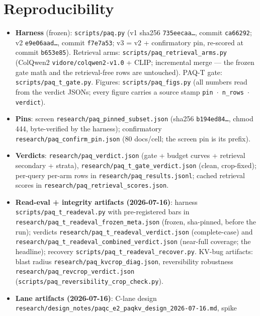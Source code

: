 \documentclass[11pt,letterpaper]{article}
\newcommand{\paqt}{\textsc{PAQ-T}}
\begin{document}
\section{Reproducibility}\label{app:repro}
\begin{itemize}\small
  \item \textbf{Harness} (frozen): \texttt{scripts/paq.py} (v1 sha256 \texttt{735eecaa\ldots},
        commit \texttt{ca66292}; v2 \texttt{e9e06aad\ldots}, commit \texttt{f7e7a53}; v3 = v2 +
        confirmatory pin, re-scored at commit \texttt{b653e85}). Retrieval arms:
        \texttt{scripts/paq\_retrieval\_arms.py} (ColQwen2 \texttt{vidore/colqwen2-v1.0} + CLIP;
        incremental merge --- the frozen gate math and the retrieval-free rows are untouched).
        \paqt{} gate: \texttt{scripts/paq\_t\_gate.py}. Figures: \texttt{scripts/paq\_figs.py}
        (all numbers read from the verdict JSONs; every figure carries a source stamp
        \texttt{pin\,$\cdot$\,n\_rows\,$\cdot$\,verdict}).
  \item \textbf{Pins}: screen \texttt{research/paq\_pinned\_subset.json} (sha256
        \texttt{b194ed84\ldots}, chmod 444, byte-verified by the harness); confirmatory
        \texttt{research/paq\_confirm\_pin.json} (80 docs/cell; the screen pin is its prefix).
  \item \textbf{Verdicts}: \texttt{research/paq\_verdict.json} (gate + budget curves + retrieval
        secondary + strata), \texttt{research/paq\_t\_gate\_verdict.json} (clean, crop-fixed);
        per-query per-arm rows in \texttt{research/paq\_results.jsonl}; cached retrieval scores
        in \texttt{research/paq\_retrieval\_scores.json}.
  \item \textbf{Read-eval + integrity artifacts (2026-07-16)}: harness
        \texttt{scripts/paq\_t\_readeval.py} with pre-registered bars in
        \texttt{research/paq\_t\_readeval\_frozen\_meta.json} (frozen, sha-pinned, before the
        run); verdicts \texttt{research/paq\_t\_readeval\_verdict.json} (complete-case) and
        \texttt{research/paq\_t\_readeval\_combined\_verdict.json} (near-full coverage; the
        headline); recovery \texttt{scripts/paq\_t\_readeval\_recover.py}. KV-bug artifacts:
        blast radius \texttt{research/paq\_kvcrop\_diag.json}, reversibility robustness
        \texttt{research/paq\_revcrop\_verdict.json}
        (\texttt{scripts/paq\_reversibility\_crop\_check.py}).
  \item \textbf{Lane artifacts (2026-07-16)}: C-lane design
        \texttt{research/design\_notes/paqc\_e2\_paqkv\_design\_2026-07-16.md}, spike

\end{itemize}
\end{document}
